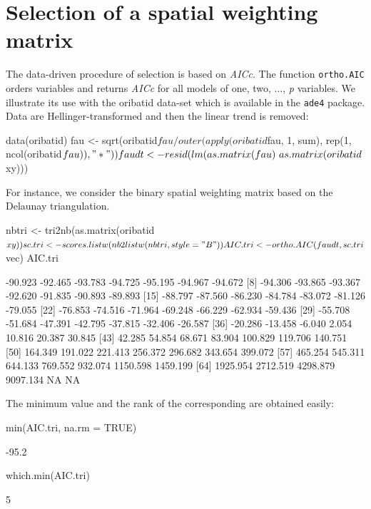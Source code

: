 \documentclass[a4paper]{article}
\begin{document}
\section{Selection of a spatial weighting matrix}
The data-driven procedure of selection is based on \textit{AICc}. The function \texttt{ortho.AIC} orders variables and returns \textit{AICc} for all models of one, two, ..., \textit{p}  variables.
We illustrate its use with the oribatid data-set which is available in the \texttt{ade4} package. Data are Hellinger-transformed and then the linear trend is removed:
\begin{Schunk}
\begin{Sinput}
 data(oribatid)
 fau <- sqrt(oribatid$fau/outer(apply(oribatid$fau, 1, 
     sum), rep(1, ncol(oribatid$fau)), "*"))
 faudt <- resid(lm(as.matrix(fau) ~ as.matrix(oribatid$xy)))
\end{Sinput}
\end{Schunk}
For instance, we consider the binary spatial weighting matrix based on the Delaunay triangulation.
\begin{Schunk}
\begin{Sinput}
 nbtri <- tri2nb(as.matrix(oribatid$xy))
 sc.tri <- scores.listw(nb2listw(nbtri, style = "B"))
 AIC.tri <- ortho.AIC(faudt, sc.tri$vec)
 AIC.tri
\end{Sinput}
\begin{Soutput}
 [1]  -90.923  -92.465  -93.783  -94.725  -95.195  -94.967  -94.672
 [8]  -94.306  -93.865  -93.367  -92.620  -91.835  -90.893  -89.893
[15]  -88.797  -87.560  -86.230  -84.784  -83.072  -81.126  -79.055
[22]  -76.853  -74.516  -71.964  -69.248  -66.229  -62.934  -59.436
[29]  -55.708  -51.684  -47.391  -42.795  -37.815  -32.406  -26.587
[36]  -20.286  -13.458   -6.040    2.054   10.816   20.387   30.845
[43]   42.285   54.854   68.671   83.904  100.829  119.706  140.751
[50]  164.349  191.022  221.413  256.372  296.682  343.654  399.072
[57]  465.254  545.311  644.133  769.552  932.074 1150.598 1459.199
[64] 1925.954 2712.519 4298.879 9097.134       NA       NA
\end{Soutput}
\end{Schunk}

The minimum value and the rank of the corresponding are obtained easily:
\begin{Schunk}
\begin{Sinput}
 min(AIC.tri, na.rm = TRUE)
\end{Sinput}
\begin{Soutput}
[1] -95.2
\end{Soutput}
\begin{Sinput}
 which.min(AIC.tri)
\end{Sinput}
\begin{Soutput}
[1] 5
\end{Soutput}
\end{Schunk}
\end{document}
